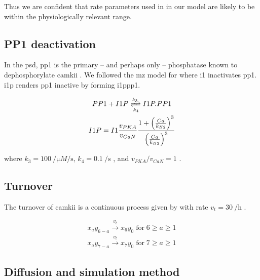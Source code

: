 \documentclass[9pt,lineno,doublespacing]{elife}
\begin{document}
Thus we are confident that rate parameters used in  in our model
are likely to be within the physiologically relevant range.

\subsection{PP1 deactivation}\label{subsec:pp1_deactivation} 

In the \gls{psd}, \gls{pp1} is the primary -- and perhaps only -- phosphatase
known to dephosphorylate \gls{camkii} \citep{strack_translocation_1997}. We
followed the \gls{mz} model for  where \gls{i1} inactivates \gls{pp1}. 
\Gls{i1p} renders \gls{pp1} inactive by forming \gls{i1ppp1}. 

\begin{equation}\label{eq:i1pandpp1}
    \begin{gathered}
        PP1 + I1P \xrightleftharpoons[k_4]{k_3} I1P.PP1 \\
        I1P = I1 \frac{v_{PKA}}{v_{CaN}} 
            \frac{1+\left(\frac{Ca}{k_{H2}}\right)^3}{\left(\frac{Ca}{k_{H2}}\right)^3}
    \end{gathered}
\end{equation}

\noindent where $k_3=\SI{100}{\per\micro M\per\second}$,
$k_4=\SI{0.1}{\per\second}$ \citep{endo_multiple_1996}, and $v_{PKA}/v_{CaN}=1$
\citep{miller_stability_2005}.

\subsection{Turnover}\label{turnover}

The turnover of \gls{camkii} is a continuous process given by  with rate
$v_{t}=\SI{30}{\per\hour}$ \citep{ehlers_activity_2003}.

\begin{equation} \label{eq:turnover}
    \begin{gathered}
        x_ay_{6-a} \xrightarrow{v_t} x_6y_0\; \text{for}\; 6\ge a\ge 1 \\
        x_ay_{7-a} \xrightarrow{v_t} x_7y_0\; \text{for}\; 7\ge a\ge 1
    \end{gathered}
\end{equation}

\subsection{Diffusion and simulation method}\label{subsec:simulator}
\end{document}
